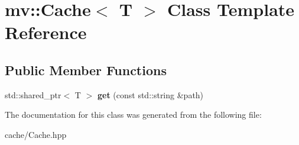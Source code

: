 \hypertarget{classmv_1_1_cache}{}\section{mv\+:\+:Cache$<$ T $>$ Class Template Reference}
\label{classmv_1_1_cache}
\subsection*{Public Member Functions}
\begin{DoxyCompactItemize}
\item 
\mbox{\label{classmv_1_1_cache_a05015c7693daffad052ca4eecb65ee3c}} 
std\+::shared\+\_\+ptr$<$ T $>$ {\bfseries get} (const std\+::string \&path)
\end{DoxyCompactItemize}


The documentation for this class was generated from the following file\+:\begin{DoxyCompactItemize}
\item 
cache/Cache.\+hpp\end{DoxyCompactItemize}
